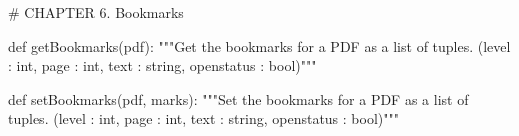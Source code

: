 # CHAPTER 6. Bookmarks

def getBookmarks(pdf):
    """Get the bookmarks for a PDF as a list of tuples.
    (level : int, page : int, text : string, openstatus : bool)"""

def setBookmarks(pdf, marks):
    """Set the bookmarks for a PDF as a list of tuples.
    (level : int, page : int, text : string, openstatus : bool)"""
